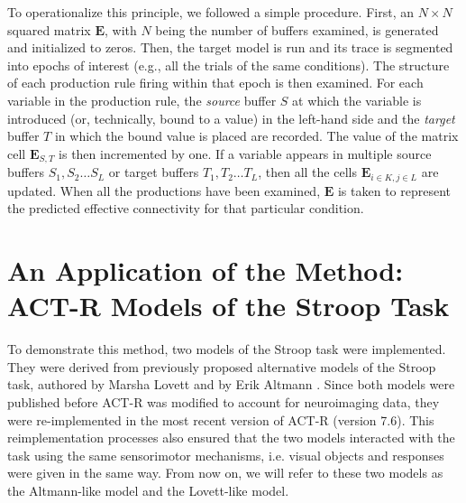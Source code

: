 \documentclass[10pt,letterpaper]{article}
\newcommand{\mat}[1]{\boldsymbol{#1}} %
\begin{document}
To operationalize this principle, we followed a simple procedure. First, an $N \times N$ squared matrix ${\mat{E}}$, with $N$ being the number of buffers examined, is generated and initialized to zeros. Then, the target model is run and its trace is segmented into epochs of interest  (e.g., all the trials of the same conditions). The structure of each production rule firing within that epoch is then examined. For each variable in the production rule, the {\it source} buffer $S$ at which the variable is introduced (or, technically, bound to a value) in the left-hand side and the {\it target} buffer $T$ in which the bound value is placed are recorded. The value of the matrix cell $\mat{E}_{S,T}$ is then incremented by one. If a variable appears in multiple source buffers $S_1, S_2 \dots S_L$ or target buffers $T_1, T_2 \dots T_L$, then all the cells $\mat{E}_{i \in K, j \in  L}$ are updated. When all the productions have been examined, $\mat{E}$ is taken to represent the predicted effective connectivity for that particular condition. 


\section{An Application of the Method: \\ ACT-R Models of the Stroop Task}

To demonstrate this method, two models of the Stroop task were implemented. They were derived from previously proposed alternative models of the Stroop task, authored by Marsha Lovett \cite{Lovett2005} and by Erik Altmann \cite{altmann2001integrative}. Since both models were published before ACT-R was modified to account for neuroimaging data, they were re-implemented in the most recent version of ACT-R (version 7.6). This reimplementation processes also ensured that the two models interacted with the task using the same sensorimotor mechanisms, i.e. visual objects and responses were given in the same way. From now on, we will refer to these two models as the Altmann-like model and the Lovett-like model. 
\end{document}
